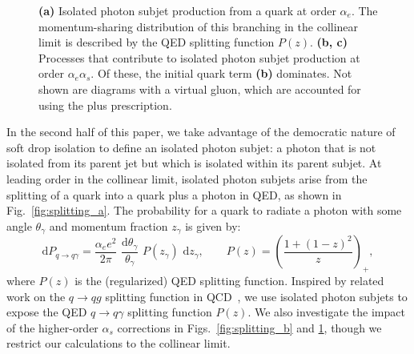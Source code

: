 \documentclass[a4paper,11pt]{article}
\DeclareRobustCommand{\Fig}[1]{Fig.~\ref{#1}}
\DeclareRobustCommand{\Figs}[2]{Figs.~\ref{#1} and \ref{#2}}
\begin{document}
\begin{figure}[t]
\begin{subfigure}[b]{0.3\textwidth}
    \caption{}
    \label{fig:splitting_c}
    \end{subfigure}
    \caption{\textbf{(a)} Isolated photon subjet production from a quark at order $\alpha_e$.  The momentum-sharing distribution of this branching in the collinear limit is described by the QED splitting function $P(z)$. \textbf{(b, c)} Processes that contribute to isolated photon subjet production at order $\alpha_e \alpha_s$. Of these, the initial quark term \textbf{(b)} dominates. Not shown are diagrams with a virtual gluon, which are accounted for using the plus prescription.}
    \label{fig:splitting}
\end{figure}

In the second half of this paper, we take advantage of the democratic nature of soft drop isolation to define an isolated photon subjet:  a photon that is not isolated from its parent jet but which is isolated within its parent subjet.
%
At leading order in the collinear limit, isolated photon subjets arise from the splitting of a quark into a quark plus a photon in QED, as shown in \Fig{fig:splitting_a}.
%
The probability for a quark to radiate a photon with some angle $\theta_{\gamma}$ and momentum fraction $z_{\gamma}$ is given by:
%
\begin{equation}
\label{eq:QEDsplit}
    \text{d} P_{q \rightarrow q \gamma} = \frac{\alpha_e e^2}{2 \pi} \,\, \frac{\text{d} \theta_{\gamma}}{\theta_{\gamma}} \,\, P(z_{\gamma}) \,\, \text{d} z_{\gamma}, \qquad 
    P(z) = \left(\frac{1 + (1 - z)^2}{z}\right)_+,
\end{equation}
where $P(z)$ is the (regularized) QED splitting function.
%
Inspired by related work on the $q \to q g$ splitting function in QCD~\cite{Larkoski:2015lea,Larkoski:2017bvj,Tripathee:2017ybi,Sirunyan:2017bsd,Caffarri:2017bmh,Kauder:2017mhg}, we use isolated photon subjets to expose the QED $q \to q \gamma$ splitting function $P(z)$.
%
We also investigate the impact of the higher-order $\alpha_s$ corrections in \Figs{fig:splitting_b}{fig:splitting_c}, though we restrict our calculations to the collinear limit.
\end{document}
